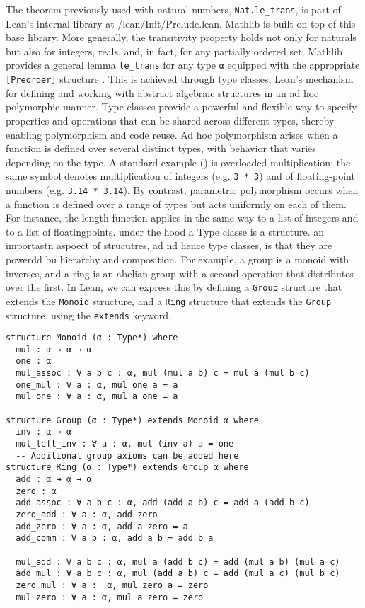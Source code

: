The theorem previously used with natural numbers, \lstinline[language=lean]|Nat.le_trans|, 
is part of Lean’s internal library at /lean/Init/Prelude.lean. 
Mathlib is built on top of this base library.
More generally, the transitivity property holds not only for naturals but also for integers, 
reals, and, in fact, for any partially ordered set. 
Mathlib provides a general lemma \lstinline[language=lean]|le_trans| for any type 
\lstinline[language=lean]|α| equipped with the appropriate \lstinline[language=lean]|[Preorder]| structure .
This is achieved through type classes, Lean’s mechanism for defining and working with 
abstract algebraic structures in an ad hoc polymorphic manner.
Type classes provide a powerful and flexible way to specify properties and 
operations that can be shared across different types, thereby enabling 
polymorphism and code reuse.
Ad hoc polymorphism arises when a function is defined over several distinct types, 
with behavior that varies depending on the type. A standard example (\cite{wadler_blott_ad_hoc_polymorphism_1988}) is overloaded 
multiplication: the same symbol denotes multiplication of integers 
(e.g. \lstinline[language=lean]|3 * 3|) and of floating-point numbers 
(e.g. \lstinline[language=lean]|3.14 * 3.14|).
By contrast, parametric polymorphism occurs when a function is defined over a 
range of types but acts uniformly on each of them. For instance, the length 
function applies in the same way to a list of integers and to a list of 
floatingpoints.
under the hood a Type classe is a structure. an importastn aspoect of strucutres,
ad nd hence type classes, is that they are powerdd bu hierarchy and composition.
For example, a group is a monoid with inverses, and a ring is an abelian group with a second 
operation that distributes over the first. In Lean, we can express this
by defining a \lstinline[language=lean]|Group| structure that extends 
the \lstinline[language=lean]|Monoid| structure, 
and a \lstinline[language=lean]|Ring| structure 
that extends the \lstinline[language=lean]|Group| structure. 
using the \lstinline[language=lean]|extends| keyword.
\begin{lstlisting}[language=lean, caption=Group and Ring Structures in Lean]
structure Monoid (α : Type*) where
  mul : α → α → α
  one : α
  mul_assoc : ∀ a b c : α, mul (mul a b) c = mul a (mul b c)
  one_mul : ∀ a : α, mul one a = a
  mul_one : ∀ a : α, mul a one = a  

structure Group (α : Type*) extends Monoid α where
  inv : α → α
  mul_left_inv : ∀ a : α, mul (inv a) a = one     
  -- Additional group axioms can be added here  
structure Ring (α : Type*) extends Group α where
  add : α → α → α
  zero : α
  add_assoc : ∀ a b c : α, add (add a b) c = add a (add b c)
  zero_add : ∀ a : α, add zero
  add_zero : ∀ a : α, add a zero = a
  add_comm : ∀ a b : α, add a b = add b a     

  mul_add : ∀ a b c : α, mul a (add b c) = add (mul a b) (mul a c)
  add_mul : ∀ a b c : α, mul (add a b) c = add (mul a c) (mul b c)
  zero_mul : ∀ a :  α, mul zero a = zero
  mul_zero : ∀ a : α, mul a zero = zero                               

\end{lstlisting}

